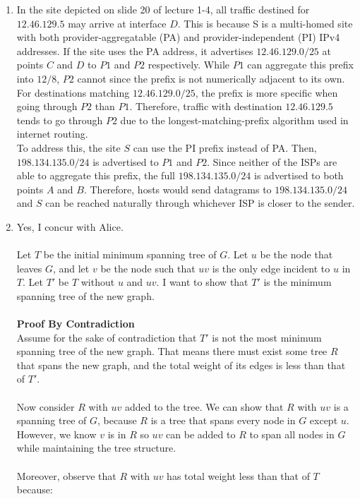 \documentclass[12pt]{article}
\begin{document}
\begin{enumerate}
	\item In the site depicted on slide 20 of lecture 1-4, all traffic destined for $12.46.129.5$ may arrive at interface $D$. This is because S is a multi-homed site with both provider-aggregatable (PA) and provider-independent (PI) IPv4 addresses. If the site uses the PA address, it advertises $12.46.129.0/25$ at points $C$ and $D$ to $P1$ and $P2$ respectively. While $P1$ can aggregate this prefix into $12/8$, $P2$ cannot since the prefix is not numerically adjacent to its own. For destinations matching $12.46.129.0/25$, the prefix is more specific when going through $P2$ than $P1$. Therefore, traffic with destination $12.46.129.5$ tends to go through $P2$ due to the longest-matching-prefix algorithm used in internet routing. \\
	
	To address this, the site $S$ can use the PI prefix instead of PA. Then, $198.134.135.0/24$ is advertised to $P1$ and $P2$. Since neither of the ISPs are able to aggregate this prefix, the full $198.134.135.0/24$ is advertised to both points $A$ and $B$. Therefore, hosts would send datagrams to $198.134.135.0/24$ and $S$ can be reached naturally through whichever ISP is closer to the sender. 
	\item Yes, I concur with Alice. \\ \\Let $T$ be the initial minimum spanning tree of $G$. Let $u$ be the node that leaves $G$, and let $v$ be the node such that $uv$ is the only edge incident to $u$ in $T$. Let $T'$ be $T$ without $u$ and $uv$. I want to show that $T'$ is the minimum spanning tree of the new graph. \\ \\ \textbf{Proof By Contradiction} \\ Assume for the sake of contradiction that $T'$ is not the most minimum spanning tree of the new graph. That means there must exist some tree $R$ that spans the new graph, and the total weight of its edges is less than that of $T'$. \\ \\ Now consider $R$ with $uv$ added to the tree. We can show that $R$ with $uv$ is a spanning tree of $G$, because $R$ is a tree that spans every node in $G$ except $u$. However, we know $v$ is in $R$ so $uv$ can be added to $R$ to span all nodes in $G$ while maintaining the tree structure. \\ \\ Moreover, observe that $R$ with $uv$ has total weight less than that of $T$ because:

\end{enumerate}
\end{document}
